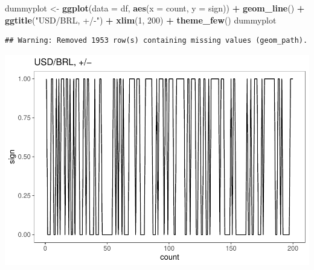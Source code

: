 \documentclass[11pt, a4paper]{report}
\newenvironment{Shaded}{\begin{snugshade}}{\end{snugshade}}
\newcommand{\CommentTok}[1]{\textcolor[rgb]{0.56,0.35,0.01}{\textit{#1}}}
\newcommand{\DataTypeTok}[1]{\textcolor[rgb]{0.13,0.29,0.53}{#1}}
\newcommand{\DecValTok}[1]{\textcolor[rgb]{0.00,0.00,0.81}{#1}}
\newcommand{\KeywordTok}[1]{\textcolor[rgb]{0.13,0.29,0.53}{\textbf{#1}}}
\newcommand{\NormalTok}[1]{#1}
\newcommand{\OperatorTok}[1]{\textcolor[rgb]{0.81,0.36,0.00}{\textbf{#1}}}
\newcommand{\StringTok}[1]{\textcolor[rgb]{0.31,0.60,0.02}{#1}}
\theoremstyle{plain}
\theoremstyle{plain}
\theoremstyle{remark}
\begin{document}
\begin{Shaded}
\begin{Highlighting}[]
\NormalTok{dummyplot <-}\StringTok{ }\KeywordTok{ggplot}\NormalTok{(}\DataTypeTok{data =}\NormalTok{ df, }\KeywordTok{aes}\NormalTok{(}\DataTypeTok{x =}\NormalTok{ count, }\DataTypeTok{y =}\NormalTok{ sign)) }\OperatorTok{+}\StringTok{ }\KeywordTok{geom_line}\NormalTok{() }\OperatorTok{+}\StringTok{ }
\StringTok{    }\KeywordTok{ggtitle}\NormalTok{(}\StringTok{"USD/BRL, +/-"}\NormalTok{) }\OperatorTok{+}\StringTok{ }\KeywordTok{xlim}\NormalTok{(}\DecValTok{1}\NormalTok{, }\DecValTok{200}\NormalTok{) }\OperatorTok{+}\StringTok{ }\KeywordTok{theme_few}\NormalTok{()}
\NormalTok{dummyplot}
\end{Highlighting}
\end{Shaded}

\begin{verbatim}
## Warning: Removed 1953 row(s) containing missing values (geom_path).
\end{verbatim}

\begin{center}\includegraphics{Econo2_P1_files/figure-latex/plots-3} \end{center}

\begin{Shaded}
\end{Shaded}
\end{document}
